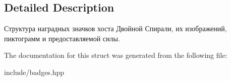 \subsection{Detailed Description}
Структура наградных значков хоста Двойной Спирали, их изображений, пиктограмм и предоставляемой силы. 

The documentation for this struct was generated from the following file\+:\begin{DoxyCompactItemize}
\item 
include/badges.\+hpp\end{DoxyCompactItemize}

